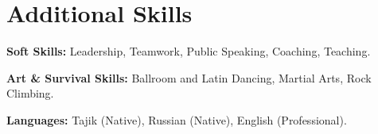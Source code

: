 \documentclass[letterpaper,11pt]{article}
\newcommand{\resumeSubHeadingListStart}{\begin{itemize}[leftmargin=0in, label={}]}
\newcommand{\resumeSubHeadingListEnd}{\end{itemize}}
\begin{document}
\section{Additional Skills}
  \vspace{2pt}
  \resumeSubHeadingListStart
    \small{\item{
      \textcolor{secondary_color}{\textbf{Soft Skills:}}{ Leadership, Teamwork, Public Speaking, Coaching, Teaching.} \\ \vspace{3pt}
        
      \textcolor{secondary_color}{\textbf{Art \& Survival Skills:}}{ Ballroom and Latin Dancing, Martial Arts, Rock Climbing.} \\ \vspace{3pt}
    
      \textcolor{secondary_color}{\textbf{Languages:}}{ Tajik (Native), Russian (Native), English (Professional).}  
    }}
  \resumeSubHeadingListEnd







\end{document}
